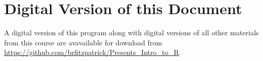 \documentclass{article}[12pt]
\begin{document}
\section*{Digital Version of this Document}
A digital version of this program along with digital versions of all other materials from this course are avavailable for download from \url{https://github.com/brfitzpatrick/Presents_Intro_to_R}.
\end{document}
